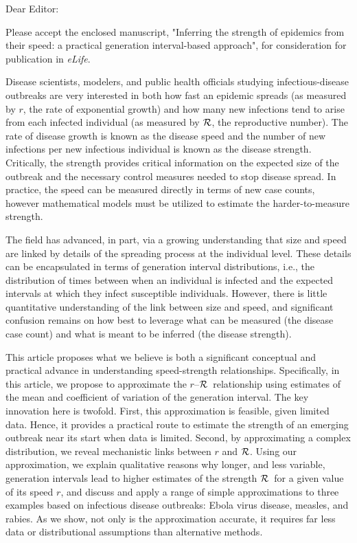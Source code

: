 \documentclass[10pt]{letter}
\newcommand{\rR}{\mbox{$r$--$\cal R$}}
\newcommand{\RR}{\ensuremath{{\cal R}}}
\begin{document}
\date{\today}

\signature{Sang Woo Park, David Champredon, Joshua S. Weitz, and Jonathan Dushoff (corresponding author)}

\begin{letter}{
}

\opening{Dear Editor:}

Please accept the enclosed manuscript, "Inferring the strength of epidemics from their speed: a practical generation interval-based approach", for consideration for publication in \emph{eLife}.

Disease scientists, modelers, and public health officials studying infectious-disease outbreaks are very interested in both how fast an epidemic spreads (as measured by $r$, the rate of exponential growth) and how many new infections tend to arise from each infected individual (as measured by \RR, the reproductive number). The rate of disease growth is known as the disease speed and the number of new infections per new infectious individual is known as the disease strength.  Critically, the strength provides critical information on the expected size of the outbreak and the necessary control measures needed to stop disease spread.  In practice, the speed can be measured directly in terms of new case counts, however mathematical models must be utilized to estimate the harder-to-measure strength.

The field has advanced, in part, via  a growing understanding that size and speed are linked by details of the spreading process at the individual level. These details can be encapsulated in terms of generation interval distributions, i.e., the distribution of times between when an individual is infected and the expected intervals at which they infect susceptible individuals.  However, there is little quantitative understanding of the link between size and speed, and significant confusion remains on how best to leverage what can be measured (the disease case count) and what is meant to be inferred (the disease strength). 

This article proposes what we believe is both a significant conceptual and practical advance in understanding speed-strength relationships. Specifically, in this article, we propose to approximate the \rR\ relationship using estimates of the mean and coefficient of variation of the generation interval. The key innovation here is twofold. First, this approximation is feasible, given limited data. Hence, it provides a practical route to estimate the strength of an emerging outbreak near its start when data is limited. Second, by approximating a complex distribution, we reveal mechanistic links between $r$ and \RR. Using our approximation, we explain qualitative reasons why longer, and less variable, generation intervals lead to higher estimates of the strength \RR\ for a given value of its speed $r$, and discuss and apply a range of simple approximations to three examples based on infectious disease outbreaks: Ebola virus disease, measles, and rabies. As we show, not only is the approximation accurate, it requires far less data or distributional assumptions than alternative methods.


\end{letter}
\end{document}
